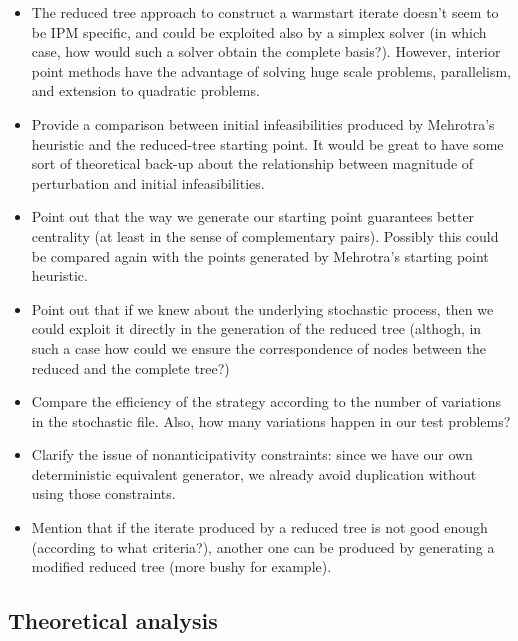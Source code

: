 \begin{itemize}
\item The reduced tree approach to construct a warmstart iterate 
doesn't seem to be IPM specific, and could be exploited also by a 
simplex solver (in which case, how would such a solver obtain the 
complete basis?). However, interior point methods have the advantage
of solving huge scale problems, parallelism, and extension to 
quadratic problems.

\item Provide a comparison between initial infeasibilities 
produced by Mehrotra's heuristic and the reduced-tree starting 
point. It would be great to have some sort of theoretical back-up 
about the relationship between magnitude of perturbation and 
initial infeasibilities.

\item Point out that the way we generate our starting point 
guarantees better centrality (at least in the sense of 
complementary pairs). Possibly this could be compared again 
with the points generated by Mehrotra's starting point heuristic.

\item Point out that if we knew about the underlying 
stochastic process, then we could exploit it directly in the 
generation of the reduced tree (althogh, in such a case how 
could we ensure the correspondence of nodes between the reduced 
and the complete tree?)

\item Compare the efficiency of the strategy according to the 
number of variations in the stochastic file. Also, how many 
variations happen in our test problems?

\item Clarify the issue of nonanticipativity constraints: 
since we have our own deterministic equivalent generator, we 
already avoid duplication without using those constraints.


\item Mention that if the iterate produced by a reduced tree 
is not good enough (according to what criteria?), another one 
can be produced by generating a modified reduced tree (more 
bushy for example).
\end{itemize}


\subsection{Theoretical analysis}

